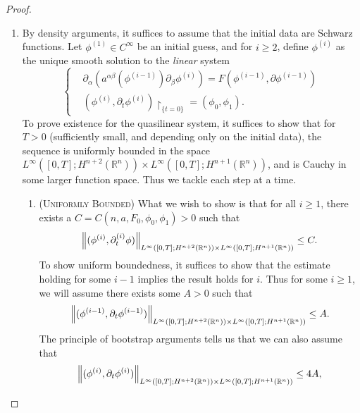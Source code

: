 \documentclass{article}
\begin{document}
\begin{proof}
	\begin{enumerate}[itemsep =-2pt,label = (\arabic{*})]
		\item By density arguments, it suffices to assume that the initial data are Schwarz functions. Let $\phi^{(1)} \in C^{\infty}$ be an initial guess, and for $i \geq 2$, define $\phi^{(i)}$ as the unique smooth solution to the \textit{linear} system 
		\begin{equation*}
			\left\{
			\begin{alignedat}{1}
			&\partial_{\alpha}(a^{\alpha\beta}(\phi^{(i - 1)})\partial_{\beta}\phi^{(i)}) = F(\phi^{(i - 1)}, \partial \phi^{(i - 1)}) \\
			&(\phi^{(i)}, \partial_{t}\phi^{(i)})\upharpoonright_{\{t = 0\}} = (\phi_{0}, \phi_{1}).
			\end{alignedat} 
			\right. 
		\end{equation*} 
		To prove existence for the quasilinear system, it suffices to show that for $T > 0$ (sufficiently small, and depending only on the initial data), the sequence is uniformly bounded in the space $L^{\infty}([0,T]; H^{n + 2}(\mathbb{R}^{n})) \times L^{\infty}([0,T]; H^{n + 1}(\mathbb{R}^{n}))$, and is Cauchy in some larger function space. Thus we tackle each step at a time. 
		\begin{enumerate}
			\item (\textsc{Uniformly Bounded}) What we wish to show is that for all $i \geq 1$, there exists a $C = C(n,a, F_{0}, \phi_{0}, \phi_{1})> 0$ such that 
			\begin{equation*}
				\left\Vert (\phi^{(i)}, \partial_{t}^{(i)}\phi) \right\Vert_{L^{\infty}([0,T]; H^{n + 2}(\mathbb{R}^{n})) \times L^{\infty}([0,T]; H^{n + 1}(\mathbb{R}^{n}))} \leq C. 
			\end{equation*}
			To show uniform boundedness, it suffices to show that the estimate holding for some $i -1$ implies the result holds for $i$. Thus for some $i \geq 1$, we will assume there exists some $A > 0$ such that 
			\begin{equation*}
				\left\Vert (\phi^{(i - 1)}, \partial_{t}\phi^{(i - 1)}) \right\Vert_{L^{\infty}([0,T]; H^{n + 2}(\mathbb{R}^{n})) \times L^{\infty}([0,T]; H^{n + 1}(\mathbb{R}^{n}))} \leq A. 
			\end{equation*}
			The principle of bootstrap arguments tells us that we can also assume that 
			\begin{equation*}
				\norm{(\phi^{(i)}, \partial_{t}\phi^{(i)})}_{L^{\infty}([0,T]; H^{n + 2}(\mathbb{R}^{n})) \times L^{\infty}([0,T]; H^{n + 1}(\mathbb{R}^{n}))} \leq 4A, 

\end{equation*}
\end{enumerate}
\end{enumerate}
\end{proof}
\end{document}
